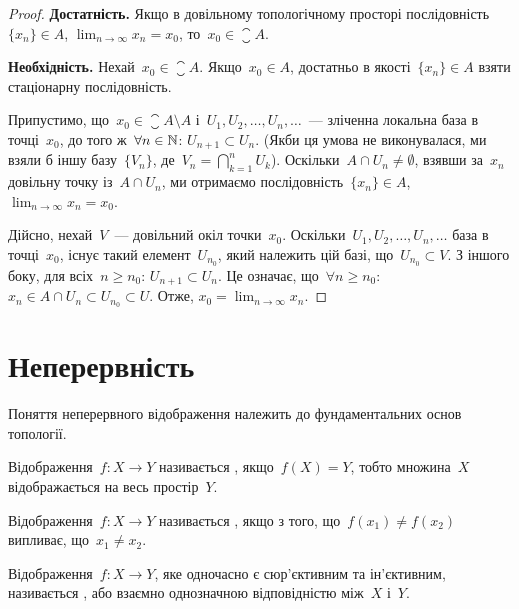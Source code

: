 \begin{proof}
    \textbf{Достатність.} Якщо в довільному топологічному просторі послідовність~$\{x_n\} \in A$, $\lim_{n \to \infty} x_n = x_0$, то~$x_0 \in \closure{A}$.

    \textbf{Необхідність.} Нехай~$x_0 \in \closure{A}$. Якщо~$x_0 \in A$, достатньо в якості~$\{x_n\} \in A$ взяти стаціонарну послідовність.

    Припустимо, що~$x_0 \in \closure{A} \setminus A$ і~$U_1, U_2, \ldots, U_n, \ldots$~--- зліченна локальна база в точці~$x_0$, до того ж~$\forall n \in \mathbb{N}$: $U_{n + 1} \subset U_n$. (Якби ця умова не виконувалася, ми взяли б іншу базу~$\{V_n\}$, де~$V_n = \bigcap_{k = 1}^n U_k$). Оскільки~$A \cap U_n \ne \emptyset$, взявши за~$x_n$ довільну точку із~$A \cap U_n$, ми отримаємо послідовність~$\{x_n\} \in A$, $\lim_{n \to \infty} x_n = x_0$.

    Дійсно, нехай~$V$~--- довільний окіл точки~$x_0$. Оскільки~$U_1, U_2, \ldots, U_n, \ldots$ база в точці~$x_0$, існує такий елемент~$U_{n_0}$, який належить цій базі, що~$U_{n_0} \subset V$. З іншого боку, для всіх~$n \ge n_0$: $U_{n + 1} \subset U_n$. Це означає, що~$\forall n \ge n_0$: $x_n \in A \cap U_n \subset U_{n_0} \subset U$. Отже, $x_0 = \lim_{n \to \infty} x_n$.
\end{proof}

\section{Неперервність}

Поняття неперервного відображення належить до фундаментальних основ топології.

\begin{definition}
    Відображення~$f: X \to Y$ називається , якщо~$f(X) = Y$, тобто множина~$X$ відображається на весь простір~$Y$.
\end{definition}

\begin{definition}
    Відображення~$f: X \to Y$ називається , якщо з того, що~$f(x_1) \ne f(x_2)$ випливає, що~$x_1 \ne x_2$.
\end{definition}

\begin{definition}
    Відображення~$f: X \to Y$, яке одночасно є сюр'єктивним та ін'єктивним, називається , або взаємно однозначною відповідністю між~$X$ і~$Y$.
\end{definition}

